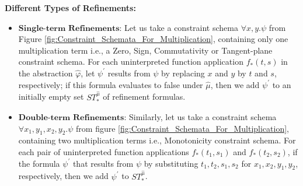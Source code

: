 \textbf{Different Types of Refinements:}

\begin{sloppypar}
\begin{itemize}
\item $\textbf{Single-term Refinements:}$
Let us take a constraint schema $\forall x, y. \psi$ from Figure \ref{fig:Constraint_Schemata_For_Multiplication}, containing only one multiplication term i.e., a Zero, Sign, Commutativity or Tangent-plane constraint schema.
For each uninterpreted function application $f_{\ast}(t, s)$ in the abstraction $\hat{\varphi}$, let $\psi^\prime$ results from $\psi$ by replacing $x$ and $y$ by $t$ and $s$, respectively; if this formula evaluates to false under $\hat{\mu}$, then we add $\psi^\prime$ to an initially empty set $ST_{\ast}^{\hat{\mu}}$ of refinement formulas. 
\item $\textbf{Double-term Refinements:}$
Similarly, let us take a constraint schema $\forall x_{1}, y_{1}, x_{2},y_{2}. \psi$ from figure \ref{fig:Constraint_Schemata_For_Multiplication}, containing two multiplication terms i.e., Monotonicity constraint schema.
For each pair of uninterpreted function applications $f_{\ast}(t_{1}, s_{1})$ and $f_{\ast}(t_{2}, s_{2})$, if the formula $\psi^\prime$ that results from $\psi$ by substituting $t_{1}, t_{2}, s_{1}, s_{2}$ for $x_{1}, x_{2}, y_{1}, y_{2}$, respectively, then we add $\psi^\prime$ to $ST_{\ast}^{\hat{\mu}}$.
\end{itemize}
\end{sloppypar}

